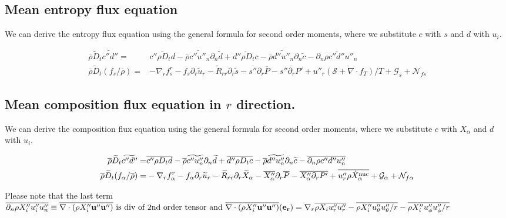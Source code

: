 \documentclass[10pt,paper=a4]{report}
\newcommand{\eht}{\overline}
\newcommand{\fht}{\widetilde}
\newcommand{\fav}{\widetilde}
\def\erho{\eht{\rho}}
\begin{document}
\subsection{Mean entropy flux equation}

We can derive the entropy flux equation using the general formula for second order moments, where we substitute $c$ with $s$ and $d$ with $u_i$.

\begin{align}
\overline{\rho}\widetilde{D}_t \widetilde{c''d''} = & \overline{c'' \rho D_t d} - \overline{\rho} \widetilde{c''u''_n}\partial_n \widetilde{d} + \overline{d'' \rho D_t c} - \overline{\rho} \widetilde{d''u''_n}\partial_n \widetilde{c} - \overline{\partial_n \rho c''d''u''_n} \\
\erho \fav{D}_t (f_s / \eht{\rho}) = &  -\nabla_r f_s^r - f_s \partial_r \fht{u}_r - \fht{R}_{rr} \partial_r \fht{s} -\eht{s''}\partial_r \eht{P} - \eht{s''\partial_r P'} + \eht{u''_r ( {\mathcal S} + \nabla \cdot f_T)  / T} + {\mathcal G_s} + {\mathcal N_{fs}}  \label{eq:rans_fs}
\end{align}

\subsection{Mean composition flux equation in $r$ direction.}

We can derive the composition flux equation using the general formula for second order moments, where we substitute $c$ with $X_\alpha$ and $d$ with $u_i$.

\begin{align}
\overline{\rho}\widetilde{D}_t \widetilde{c''d''} = & \overline{c'' \rho D_t d} - \overline{\rho} \widetilde{c''u''_n}\partial_n \widetilde{d} + \overline{d'' \rho D_t c} - \overline{\rho} \widetilde{d''u''_n}\partial_n \widetilde{c} - \overline{\partial_n \rho c''d''u''_n} \\
\erho \fav{D}_t (f_\alpha / \eht{\rho}) = &  -\nabla_r f_\alpha^r  - f_\alpha \partial_r \fht{u}_r - \fht{R}_{rr} \partial_r \fht{X}_\alpha -\eht{X''_\alpha} \partial_r \eht{P} - \eht{X''_\alpha \partial_r P'} + \overline{u''_r \rho \dot{X}_\alpha^{\rm nuc}} + {\mathcal G_\alpha} + {\mathcal N_{f\alpha}} \label{eq:rans_falpha} \\
\end{align}

\noindent Please note that the last term $ {\overline{\partial_n \rho X''_i u''_i u''_n}} \equiv \eht{\nabla \cdot (\rho X''_i {\bf{u''}} {\bf{u''}})} {\mbox{\ is div of 2nd order tensor}} \mbox{ and } \eht{\nabla \cdot (\rho X''_i {\bf{u''}} {\bf{u''}})}({\bf{e_r}}) = \nabla_r \eht{\rho X_i u''_r u''_r}  -\eht{\rho X''_i u''_\theta u''_\theta/r} - \eht{\rho X''_i u''_\phi u''_\phi/r} $\\
\end{document}
